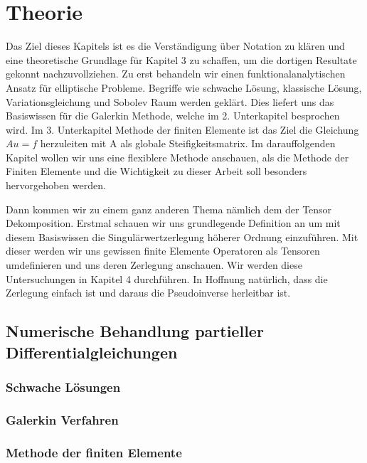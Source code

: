 \documentclass[12pt,a4paper]{scrartcl}
\numberwithin{equation}{section}
\begin{document}
\section{Theorie}
Das Ziel dieses Kapitels ist es die Verständigung über Notation zu klären und eine theoretische Grundlage für Kapitel 3 zu schaffen, um die dortigen Resultate gekonnt nachzuvollziehen. 
Zu erst behandeln wir einen funktionalanalytischen Ansatz für elliptische Probleme. Begriffe wie schwache Lösung, klassische Lösung, Variationsgleichung und Sobolev Raum werden geklärt. Dies liefert uns das Basiswissen für die Galerkin Methode, welche im 2. Unterkapitel besprochen wird. 
Im 3. Unterkapitel Methode der finiten Elemente ist das Ziel die Gleichung $Au=f$ herzuleiten mit A als globale Steifigkeitsmatrix.
Im darauffolgenden Kapitel wollen wir uns eine flexiblere Methode anschauen, als die Methode der Finiten Elemente und die Wichtigkeit zu dieser Arbeit soll besonders hervorgehoben werden.

Dann kommen wir zu einem ganz anderen Thema nämlich dem der Tensor Dekomposition. 
Erstmal schauen wir uns grundlegende Definition an um mit diesem Basiswissen die Singulärwertzerlegung höherer Ordnung einzuführen. Mit dieser werden wir uns gewissen finite Elemente Operatoren als Tensoren umdefinieren und uns deren Zerlegung anschauen. Wir werden diese Untersuchungen in Kapitel 4 durchführen. In Hoffnung natürlich, dass die Zerlegung einfach ist und daraus die Pseudoinverse herleitbar ist.






\newpage
\subsection{Numerische Behandlung partieller Differentialgleichungen}
\subsubsection{Schwache Lösungen}


\newpage
\subsubsection{Galerkin Verfahren}


\newpage
\subsubsection{Methode der finiten Elemente}

\end{document}
